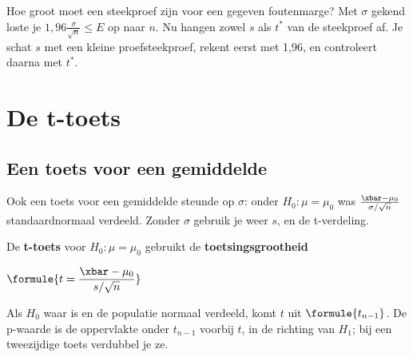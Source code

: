 Hoe groot moet een steekproef zijn voor een gegeven foutenmarge? Met $\sigma$ gekend loste je $1{,}96\frac{\sigma}{\sqrt n} \leqslant E$ op naar $n$. Nu hangen zowel $s$ als $t^*$ van de steekproef af. Je schat $s$ met een kleine proefsteekproef, rekent eerst met 1,96, en controleert daarna met $t^*$.


\begin{oefeningen}
\end{oefeningen}

\section{De t-toets}

\subsection{Een toets voor een gemiddelde}

Ook een toets voor een gemiddelde steunde op $\sigma$: onder $H_0\colon \mu = \mu_0$ was $\frac{\xbar - \mu_0}{\sigma/\sqrt n}$ standaardnormaal verdeeld. Zonder $\sigma$ gebruik je weer $s$, en de t-verdeling.

\begin{theorie}
De \textbf{\textcolor{accent}{t-toets}} voor $H_0\colon \mu = \mu_0$ gebruikt de \textbf{\textcolor{accent}{toetsingsgrootheid}}

\vspace{1mm}
\qquad $\formule{t = \dfrac{\xbar - \mu_0}{s/\sqrt n}}$

\vspace{1mm}
Als $H_0$ waar is en de populatie normaal verdeeld, komt $t$ uit $\formule{t_{n-1}}$. De p-waarde is de oppervlakte onder $t_{n-1}$ voorbij $t$, in de richting van $H_1$; bij een tweezijdige toets verdubbel je ze.
\end{theorie}

